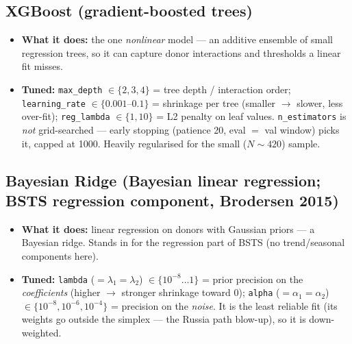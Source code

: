 \documentclass[11pt,a4paper]{article}
\newcommand{\highlight}[1]{\textcolor{accent}{\textbf{#1}}}
\newcommand{\src}[1]{{\normalfont\small\textcolor{muted}{(#1)}}}
\begin{document}
\subsection{XGBoost \src{gradient-boosted trees}}
\begin{itemize}
  \item \highlight{What it does:} the one \emph{nonlinear} model --- an additive ensemble of small
    regression trees, so it can capture donor interactions and thresholds a linear fit misses.
  \item \highlight{Tuned:} \texttt{max\_depth} $\in\{2,3,4\}$ = tree depth / interaction order;
    \texttt{learning\_rate} $\in\{0.001\text{--}0.1\}$ = shrinkage per tree (smaller $\to$ slower, less
    over-fit); \texttt{reg\_lambda} $\in\{1,10\}$ = L2 penalty on leaf values. \texttt{n\_estimators} is
    \emph{not} grid-searched --- early stopping (patience 20, eval $=$ val window) picks it, capped at 1000.
    Heavily regularised for the small ($N\!\sim\!420$) sample.
\end{itemize}

\subsection{Bayesian Ridge \src{Bayesian linear regression; BSTS regression component, Brodersen 2015}}
\begin{itemize}
  \item \highlight{What it does:} linear regression on donors with Gaussian priors --- a Bayesian ridge.
    Stands in for the regression part of BSTS (no trend/seasonal components here).
  \item \highlight{Tuned:} \texttt{lambda} ($=\lambda_1=\lambda_2$) $\in\{10^{-8}\dots1\}$ = prior precision
    on the \emph{coefficients} (higher $\to$ stronger shrinkage toward 0); \texttt{alpha}
    ($=\alpha_1=\alpha_2$) $\in\{10^{-8},10^{-6},10^{-4}\}$ = precision on the \emph{noise}. It is the least
    reliable fit (its weights go outside the simplex --- the Russia path blow-up), so it is down-weighted.
\end{itemize}

\end{document}
